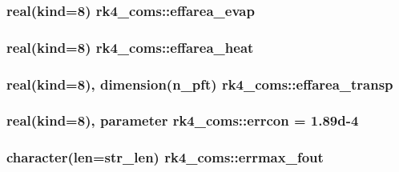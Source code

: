 \subsubsection[{effarea\+\_\+evap}]{\setlength{\rightskip}{0pt plus 5cm}real(kind=8) rk4\+\_\+coms\+::effarea\+\_\+evap}\label{namespacerk4__coms_aae531dd6ba4cf10a03c3fad2b61071bb}
\hypertarget{namespacerk4__coms_af575cfc8fb0e2063e1d3a08be26aea3a}{}
\subsubsection[{effarea\+\_\+heat}]{\setlength{\rightskip}{0pt plus 5cm}real(kind=8) rk4\+\_\+coms\+::effarea\+\_\+heat}\label{namespacerk4__coms_af575cfc8fb0e2063e1d3a08be26aea3a}
\hypertarget{namespacerk4__coms_aa9b9a7fcec09aad8a6d3423c30c3b1de}{}
\subsubsection[{effarea\+\_\+transp}]{\setlength{\rightskip}{0pt plus 5cm}real(kind=8), dimension(n\+\_\+pft) rk4\+\_\+coms\+::effarea\+\_\+transp}\label{namespacerk4__coms_aa9b9a7fcec09aad8a6d3423c30c3b1de}
\hypertarget{namespacerk4__coms_a5b9d4d10eb75a3f0b44f3876ade2c3eb}{}
\subsubsection[{errcon}]{\setlength{\rightskip}{0pt plus 5cm}real(kind=8), parameter rk4\+\_\+coms\+::errcon = 1.\+89d-\/4}\label{namespacerk4__coms_a5b9d4d10eb75a3f0b44f3876ade2c3eb}
\hypertarget{namespacerk4__coms_af90527ec55879335bb58710234142b14}{}
\subsubsection[{errmax\+\_\+fout}]{\setlength{\rightskip}{0pt plus 5cm}character(len=str\+\_\+len) rk4\+\_\+coms\+::errmax\+\_\+fout}\label{namespacerk4__coms_af90527ec55879335bb58710234142b14}
\hypertarget{namespacerk4__coms_a87d69315c8ce5a8eece7631c044e56e5}{}
